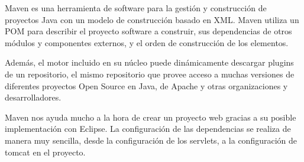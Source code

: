 Maven es una herramienta de software para la gestión y construcción de proyectos Java con un modelo de construcción basado en XML. Maven utiliza un POM para describir el proyecto software a construir, sus dependencias de otros módulos y componentes externos, y el orden de construcción de los elementos. 

Además, el motor incluido en su núcleo puede dinámicamente descargar plugins de un repositorio, el mismo repositorio que provee acceso a muchas versiones de diferentes proyectos Open Source en Java, de Apache y otras organizaciones y desarrolladores. \cite{wiki:maven}

Maven nos ayuda mucho a la hora de crear un proyecto web gracias a su posible implementación con Eclipse. La configuración de las dependencias se realiza de manera muy sencilla, desde la configuración de los servlets, a la configuración de tomcat en el proyecto.
